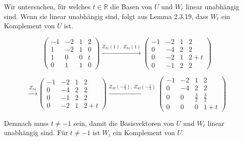 \documentclass[a4paper,12pt]{article}
\begin{document}
Wir untersuchen, für welches $t \in \mathbb{R}$ die Basen von $U$ und $W_t$ linear unabhängig sind.
Wenn sie linear unabhängig sind, folgt aus Lemma 2.3.19, dass $W_t$ ein Komplement von $U$ ist.

\[
  \begin{pmatrix} -1 & -2 & 1 & 2 \\ 1 & -2 & 1 & 0 \\ 1 & 0 & 0 & t \\ 0 & 1 & 1 & 0 \end{pmatrix}
  \xrightarrow{Z_{21}(1),\; Z_{31}(1)}
  \begin{pmatrix} -1 & -2 & 1 & 2 \\ 0 & -4 & 2 & 2 \\ 0 & -2 & 1 & 2+t \\ 0 & -1 & 2 & 2 \end{pmatrix}
\]

\[
  \xrightarrow{Z_{34}}
  \begin{pmatrix} -1 & -2 & 1 & 2 \\ 0 & -4 & 2 & 2 \\ 0 & -1 & 2 & 2 \\ 0 & -2 & 1 & 2+t \end{pmatrix}
  \xrightarrow{Z_{32}\!\left(-\tfrac{1}{4}\right),\; Z_{42}\!\left(-\tfrac{1}{2}\right)}
  \begin{pmatrix} -1 & -2 & 1 & 2 \\ 0 & -4 & 2 & 2 \\ 0 & 0 & \tfrac{3}{2} & \tfrac{3}{2} \\ 0 & 0 & 0 & 1+t \end{pmatrix}
\]

Demnach muss $t \neq -1$ sein, damit die Basisvektoren von $U$ und $W_t$ linear unabhängig sind.
Für $t \neq -1$ ist $W_t$ ein Komplement von $U$.
\end{document}
